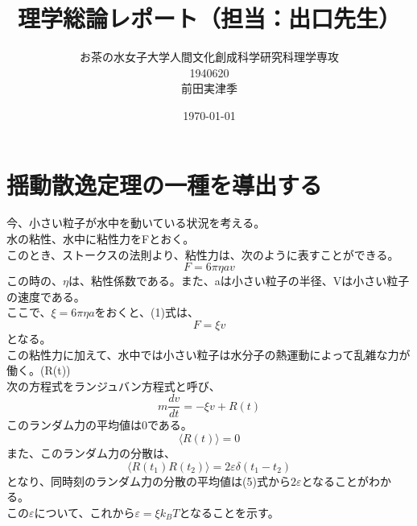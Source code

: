 \documentclass[10pt]{jreport}
\begin{document}
\title{理学総論レポート（担当：出口先生）}

\author{お茶の水女子大学人間文化創成科学研究科理学専攻 \\1940620 \\ 前田実津季}
\date{\today}
\maketitle

\section*{揺動散逸定理の一種を導出する}
今、小さい粒子が水中を動いている状況を考える。\\
水の粘性、水中に粘性力をFとおく。\\
このとき、ストークスの法則より、粘性力は、次のように表すことができる。\\
\begin{equation}
F=6\pi \eta av
\end{equation}
この時の、$\eta$は、粘性係数である。また、aは小さい粒子の半径、Vは小さい粒子の速度である。\\
ここで、$\xi = 6\pi\eta a$をおくと、(1)式は、
\begin{equation}
F = \xi v
\end{equation}
となる。\\
この粘性力に加えて、水中では小さい粒子は水分子の熱運動によって乱雑な力が働く。(R(t))\\
次の方程式をランジュバン方程式と呼び、
\begin{equation}
m\frac{dv}{dt}=-\xi v +R(t)
\end{equation}
このランダム力の平均値は0である。
\begin{equation}
\langle R(t)\rangle = 0
\end{equation}
また、このランダム力の分散は、
\begin{equation}
\langle R(t_1)R(t_2) \rangle = 2\varepsilon \delta(t_1-t_2)
\end{equation}
となり、同時刻のランダム力の分散の平均値は(5)式から$2\varepsilon$となることがわかる。\\
この$\varepsilon$について、これから$\varepsilon=\xi k_B T$となることを示す。\\
\end{document}
